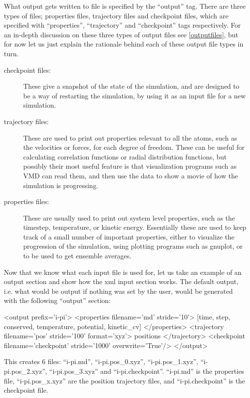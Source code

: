 \documentclass[11pt,english,fleqn]{report}
\newenvironment{code}{%
\footnotesize 
\verbatim
}{
\endverbatim
\normalsize
}
\begin{document}
What output gets written to file is specified by the {}``output'' tag.
There are three types of files;
properties files, trajectory files and checkpoint files, which 
are specified with {}``properties'', {}``trajectory'' 
and {}``checkpoint'' tags respectively.
For an in-depth discussion on these three types
of output files see \ref{outputfiles}, 
but for now let us just explain the rationale
behind each of these output file types in turn.

\begin{description}
\item[checkpoint files:]
These give a snapshot of the state of the simulation,
and are designed to be a way of restarting
the simulation, by using it as an input file for a new \ipi simulation. 
\item[trajectory files:] 
These are used to print out properties
relevant to all the atoms, such as the velocities or forces, for each degree of freedom.
These can be useful
for calculating correlation functions or radial distribution functions,
but possibly their most useful feature is that visualization
programs such as VMD can read them, and then use the data to show
a movie of how the simulation is progressing. 
\item[properties files:] 
These are usually used to print out
system level properties, such as the timestep, temperature,
or kinetic energy. Essentially these are used to keep track of a small
number of important properties, either to visualize the
progression of the simulation, using plotting programs such as gnuplot, 
or to be used to get ensemble averages.
\end{description}

Now that we know what each input file is used for, let us take an
example of an output section and show how the xml input section works.
The default output, i.e. what would be output if nothing was set by the user, 
would be generated with the following {}``output'' section:

\begin{code}
<output prefix='i-pi'>
   <properties filename='md' stride='10'>
      [time, step, conserved, temperature, potential, kinetic_cv]
   </properties>
   <trajectory filename='pos' stride='100' format='xyz'>
      positions
   </trajectory>
   <checkpoint filename='checkpoint' stride='1000' overwrite='True'/>
</output>
\end{code}

This creates 6 files: {}``i-pi.md'', {}``i-pi.pos\_0.xyz'',
{}``i-pi.pos\_1.xyz'', {}``i-pi.pos\_2.xyz'', {}``i-pi.pos\_3.xyz''
and {}``i-pi.checkpoint''. 
{}``i-pi.md'' is the properties file, {}``i-pi.pos\_x.xyz'' are the
position trajectory files, and {}``i-pi.checkpoint'' is the
checkpoint file.
\end{document}
